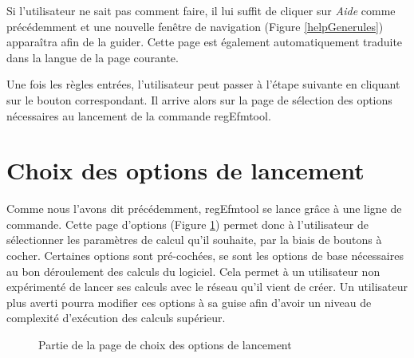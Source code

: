 Si l'utilisateur ne sait pas comment faire, il lui suffit de cliquer sur \textit{Aide} comme précédemment et une nouvelle fen\^etre de navigation (Figure \ref{helpGenerules}) appara\^itra afin de la guider. Cette page est également automatiquement traduite dans la langue de la page courante. 

Une fois les règles entrées, l'utilisateur peut passer à l'étape suivante en cliquant sur le bouton correspondant. Il arrive alors sur la page de sélection des options nécessaires au lancement de la commande regEfmtool.

\section{Choix des options de lancement}

Comme nous l'avons dit précédemment, regEfmtool se lance gr\^ace à une ligne de commande. Cette page d'options (Figure \ref{options}) permet donc à l'utilisateur de sélectionner les paramètres de calcul qu'il souhaite, par la biais de boutons à cocher. Certaines options sont pré-cochées, se sont les options de base nécessaires au bon déroulement des calculs du logiciel. Cela permet à un utilisateur non expérimenté de lancer ses calculs avec le réseau qu'il vient de créer. Un utilisateur plus averti pourra modifier ces options à sa guise afin d'avoir un niveau de complexité d'exécution des calculs supérieur.\\

\begin{figure}[!ht]
	\begin{center}
		\caption{Partie de la page de choix des options de lancement}
  		\label{options}
  	\end{center}	
\end{figure}

